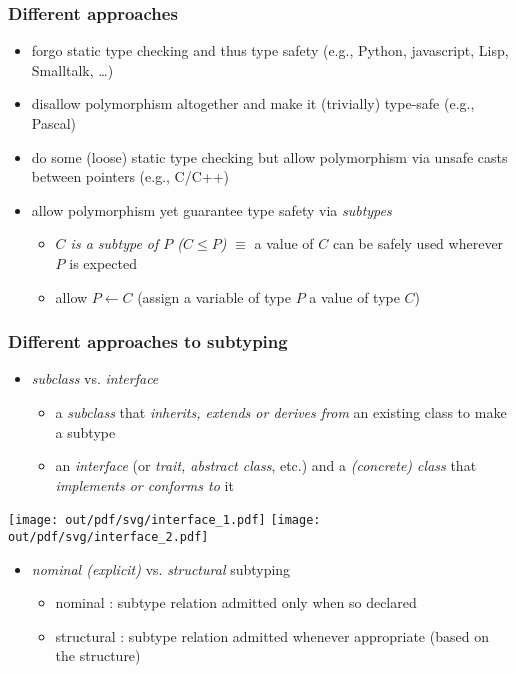 \documentclass[12pt,dvipdfmx]{beamer}
\newcommand{\ao}[1]{{\color{blue}#1}}
\begin{document}
\begin{frame}
  \frametitle{Different approaches}

  \begin{itemize}
  \item forgo static type checking and thus type safety
    (e.g., Python, javascript, Lisp, Smalltalk, \ldots)
  \item disallow polymorphism altogether and make it (trivially) type-safe
    (e.g., Pascal)
  \item do some (loose) static type checking but allow polymorphism
    via unsafe casts between pointers (e.g., C/C++)
  \item allow polymorphism yet guarantee type safety via \ao{\it subtypes}
    \begin{itemize}
    \item \ao{\it $C$ is a subtype of $P$ ($C \leq P$)} $\equiv$
      a value of $C$ can be safely used wherever $P$ is expected
    \item allow $P \leftarrow C$
      (assign a variable of type $P$ a value of type $C$)
    \end{itemize}
  \end{itemize}
\end{frame}


\begin{frame}
  \frametitle{Different approaches to subtyping}

  \begin{itemize}
  \item \ao{\it subclass} vs. \ao{\it interface}
    \begin{itemize}
    \item a \ao{\it subclass} that {\it inherits, extends or derives from}
      an existing class to make a subtype
    \item an \ao{\it interface} (or {\it trait, abstract class}, etc.)
      and a \ao{\it (concrete) class} that {\it implements or conforms to} it
    \end{itemize}
  \end{itemize}

  \begin{center}
    \texttt{[image: out/pdf/svg/interface\_1.pdf]}
    \texttt{[image: out/pdf/svg/interface\_2.pdf]}
  \end{center}

  \begin{itemize}
  \item \ao{\it nominal (explicit)} vs. \ao{\it structural} subtyping
    \begin{itemize}
    \item nominal : subtype relation admitted only when so declared
    \item structural : subtype relation admitted whenever appropriate
      (based on the structure)
    \end{itemize}
  \end{itemize}
\end{frame}
\end{document}
